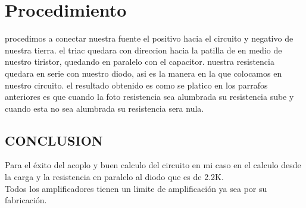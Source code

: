 \documentclass[11pt,a4paper]{article}
\begin{document}
\section{Procedimiento}
procedimos a conectar nuestra fuente el positivo hacia el circuito y negativo de nuestra tierra. el triac quedara con direccion hacia la patilla de en medio de nuestro tiristor, quedando en paralelo con el capacitor. nuestra resistencia quedara en serie con nuestro diodo, asi es la manera en la que colocamos en nuestro circuito. el resultado obtenido es como se platico en los parrafos anteriores es que cuando la foto resistencia sea alumbrada su resistencia sube y cuando esta no sea alumbrada su resistencia sera nula.

\newpage 

\subsection{CONCLUSION}
Para el éxito del acoplo y buen calculo del circuito en mi caso en el calculo desde la carga y la resistencia en paralelo al diodo que es de 2.2K.\\
Todos los amplificadores tienen un limite de amplificación ya sea por su fabricación.
\end{document}
